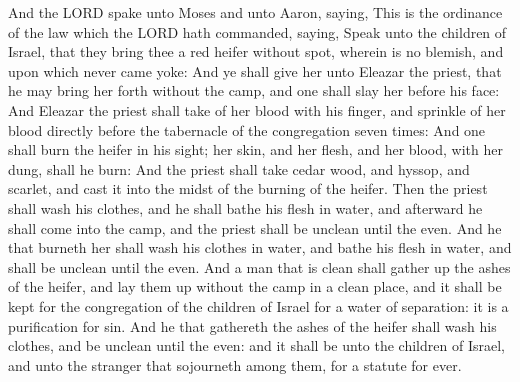  And the LORD spake unto Moses and unto Aaron, saying,
 This is the ordinance of the law which the LORD hath
commanded, saying, Speak unto the children of Israel, that they bring
thee a red heifer without spot, wherein is no blemish, and upon which
never came yoke:  And ye shall give her unto Eleazar the
priest, that he may bring her forth without the camp, and one shall slay
her before his face:  And Eleazar the priest shall take of
her blood with his finger, and sprinkle of her blood directly before the
tabernacle of the congregation seven times:  And one shall
burn the heifer in his sight; her skin, and her flesh, and her blood,
with her dung, shall he burn:  And the priest shall take
cedar wood, and hyssop, and scarlet, and cast it into the midst of the
burning of the heifer.  Then the priest shall wash his
clothes, and he shall bathe his flesh in water, and afterward he shall
come into the camp, and the priest shall be unclean until the even.
 And he that burneth her shall wash his clothes in water,
and bathe his flesh in water, and shall be unclean until the even.
 And a man that is clean shall gather up the ashes of the
heifer, and lay them up without the camp in a clean place, and it shall
be kept for the congregation of the children of Israel for a water of
separation: it is a purification for sin.  And he that
gathereth the ashes of the heifer shall wash his clothes, and be unclean
until the even: and it shall be unto the children of Israel, and unto
the stranger that sojourneth among them, for a statute for ever.

